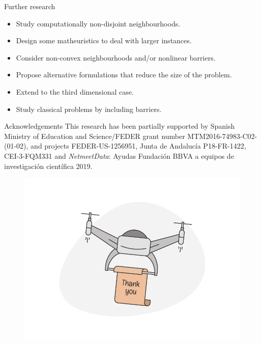 \documentclass[slidestop,usepdftitle=false,10pt]{beamer}
\begin{document}
	\begin{frame}{Further research}
		\begin{itemize}
			\item Study computationally non-disjoint neighbourhoods.
			\item Design some matheuristics to deal with larger instances.
			\item Consider non-convex neighbourhoods and/or nonlinear barriers.
			\item Propose alternative formulations that reduce the size of the problem.
			\item Extend to the third dimensional case.
			\item Study classical problems by including barriers.
		\end{itemize}
	\end{frame}

	\begin{frame}{Acknowledgements}
		This research has been partially supported by Spanish Ministry of Education and Science/FEDER grant number  MTM2016-74983-C02-(01-02), and projects FEDER-US-1256951, Junta de Andaluc\'ia P18-FR-1422, CEI-3-FQM331 and  \textit{NetmeetData}: Ayudas Fundaci\'on BBVA a equipos de investigaci\'on cient\'ifica 2019.
	\end{frame}
	
	\begin{frame}
		\bigskip
		\begin{figure}
			\centering
			\includegraphics[width=0.7\linewidth]{thank}
			\label{fig:thank}
		\end{figure}
	\end{frame}
	
\end{document}
